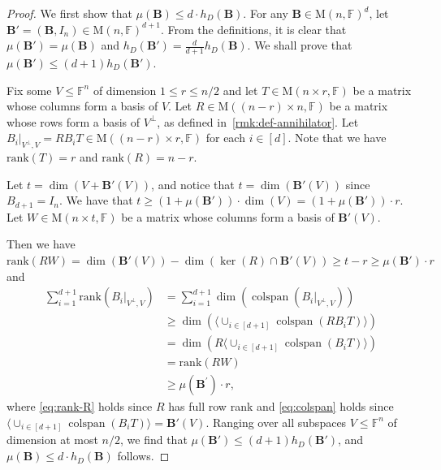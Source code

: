 \documentclass{toc}
\theoremstyle{plain}
\numberwithin{equation}{section}
\theoremstyle{definition}
\newcommand{\F}{\mathbb{F}}
\newcommand{\rk}{\mathrm{rank}}
\newcommand{\M}{\mathrm{M}}
\newcommand{\tuple}[1]{\mathbf{#1}}
\newcommand{\vB}{\tuple{B}}
\newcommand{\colspan}{\operatorname{colspan}}
\newcommand{\ann}{V^{\perp}}
\begin{document}
\begin{proof}
  We first show that $\mu(\vB)\leq d\cdot h_D(\vB)$. For any $\vB\in \M(n,\F)^d$, let $\vB'=(\vB,I_n)\in \M(n,\F)^{d+1}$. From the definitions, it is clear that $\mu(\vB')=\mu(\vB)$ and $h_D(\vB')=\frac{d}{d+1} h_D(\vB)$. We shall prove that $\mu(\vB')\leq (d+1)h_D(\vB')$.
  
  Fix some $V\leq \F^n$ of dimension $1 \leq r\leq n/2$ and let $T\in \M(n\times r,\F)$ be a matrix whose columns form a basis of $V$. Let $R\in \M((n-r)\times n,\F)$ be a matrix whose rows form a basis of $\ann$, as defined in~\cref{rmk:def-annihilator}. Let $B_i|_{\ann,V}=RB_iT\in\M((n-r)\times r,\F)$ for each $i\in[d]$. Note that we have $\rk(T)=r$ and $\rk(R)=n-r$.
  
  Let $t=\dim(V+\vB'(V))$, and notice that $t=\dim(\vB'(V))$ since $B_{d+1}=I_n$. We have that $t\geq (1+\mu(\vB'))\cdot\dim(V)=(1+\mu(\vB'))\cdot r$. Let $W\in \M(n\times t,\F)$ be a matrix whose columns form a basis of $\vB'(V)$. 
    
  Then we have $\rk(RW)=\dim(\vB'(V))-\dim(\ker(R)\cap \vB'(V))\geq t-r \geq \mu(\vB')\cdot r$ and
  \begin{align}
    \sum_{i=1}^{d+1}\rk(B_i|_{\ann, V}) & =  \sum_{i=1}^{d+1}\dim(\colspan(B_i|_{\ann, V})) \nonumber \\
    & \geq \dim(\langle\cup_{i\in[d+1]} \colspan(RB_i T)\rangle) \nonumber \\ 
    & = \dim(R\langle\cup_{i\in[d+1]} \colspan(B_iT)\rangle)\label{eq:rank-R} \\
    & = \rk(RW) \label{eq:colspan} \\
    & \geq \mu(\vB^{\prime})\cdot r,\nonumber
  \end{align}
  where \eqref{eq:rank-R} holds since $R$ has full row rank and \eqref{eq:colspan} holds  since $\langle \cup_{i\in[d+1]} \colspan(B_iT)\rangle=\vB'(V)$.
  Ranging over all subspaces $V\leq\F^n$ of dimension at most $n/2$, %
  we find that $\mu(\vB')\leq (d+1) h_D(\vB')$, and $\mu(\vB)\leq d\cdot h_D(\vB)$ follows.
  

\end{proof}
\end{document}
